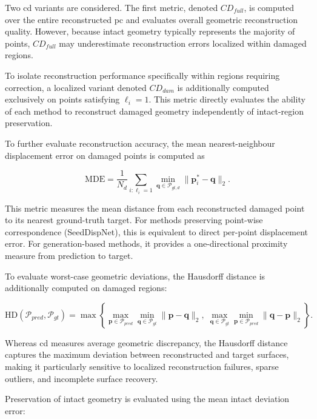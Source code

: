 Two \ac{cd} variants are considered. The first metric, denoted ${CD}_{full}$, is computed over the entire reconstructed \ac{pc} and evaluates overall geometric reconstruction quality. However, because intact geometry typically represents the majority of points, ${CD}_{full}$ may underestimate reconstruction errors localized within damaged regions.

To isolate reconstruction performance specifically within regions requiring correction, a localized variant denoted ${CD}_{dam}$ is additionally computed exclusively on points satisfying $\ell_i = 1$. This metric directly evaluates the ability of each method to reconstruct damaged geometry independently of intact-region preservation.

To further evaluate reconstruction accuracy, the mean nearest-neighbour displacement error on damaged points is computed as

\begin{equation}
\mathrm{MDE} =
\frac{1}{N_d}
\sum_{i:\ell_i=1}
\min_{\mathbf{q} \in \mathcal{P}_{gt,d}}
\|\mathbf{p}_i^* - \mathbf{q}\|_2.
\end{equation}

This metric measures the mean distance from each reconstructed damaged point to its nearest ground-truth target. For methods preserving point-wise correspondence (SeedDispNet), this is equivalent to direct per-point displacement error. For generation-based methods, it provides a one-directional proximity measure from prediction to target.

To evaluate worst-case geometric deviations, the Hausdorff distance is additionally computed on damaged regions:

\begin{equation}
\mathrm{HD}(\mathcal{P}_{pred}, \mathcal{P}_{gt}) =
\max \left\{
\max_{\mathbf{p} \in \mathcal{P}_{pred}}
\min_{\mathbf{q} \in \mathcal{P}_{gt}}
\|\mathbf{p} - \mathbf{q}\|_2,
\;
\max_{\mathbf{q} \in \mathcal{P}_{gt}}
\min_{\mathbf{p} \in \mathcal{P}_{pred}}
\|\mathbf{q} - \mathbf{p}\|_2
\right\}.
\end{equation}

Whereas \ac{cd} measures average geometric discrepancy, the Hausdorff distance captures the maximum deviation between reconstructed and target surfaces, making it particularly sensitive to localized reconstruction failures, sparse outliers, and incomplete surface recovery.

Preservation of intact geometry is evaluated using the mean intact deviation error:

